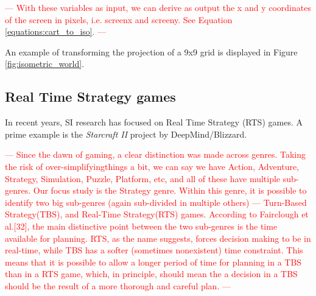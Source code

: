 \textcolor{red}{---
With these variables as input, we can derive as output the x and y coordinates of the screen in pixels, i.e. screenx and screeny. 
See Equation \ref{equations:cart_to_iso}.
---}



An example of transforming the projection of a 9x9 grid is displayed in Figure \ref{fig:isometric_world}.

\subsection{Real Time Strategy games} \label{subsection:RTS}
In recent years, SI research has focused on Real Time Strategy (RTS) games.
A prime example is the \textit{Starcraft II} project by DeepMind/Blizzard.


\textcolor{red}{---
Since the dawn of gaming, a clear distinction was made across genres. 
Taking the risk of over-simplifyingthings a bit, 
we can say we have Action, Adventure, Strategy, Simulation, Puzzle, Platform, etc, 
and all of these have multiple sub-genres. 
Our focus study is the Strategy genre. 
Within this genre, it is possible to identify two big sub-genres (again sub-divided in multiple others) — 
Turn-Based Strategy(TBS), and
Real-Time Strategy(RTS) games. 
According to Fairclough et al.[32], the main distinctive point between the two sub-genres is the time available for planning. 
RTS, as the name suggests, forces decision making to be in real-time, 
while TBS has a softer (sometimes nonexistent) time constraint. 
This means that it is possible to allow a longer period of time for planning in a TBS than in a RTS game, 
which, in principle, should mean the a decision in a TBS should be the result of a more thorough and careful plan.
---}

